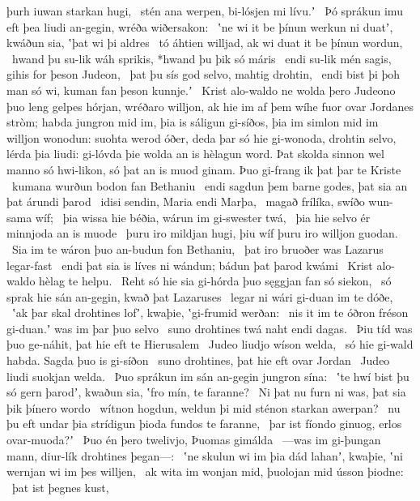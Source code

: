 þurh iuwan starkan hugi, \hld\ stén ana werpen,
bi-lósjen mi lívu.ʼ \hld\ Þó sprákun imu eft þea liudi an-gegin,
wréða wiðersakon: \hld\ ʽne wi it be þínun werkun ni duatʼ, kwáðun sia,
ʽþat wi þi aldres \hld\ tó áhtien willjad,
ak wi duat it be þínun wordun, \hld\ hwand þu su-lik wáh sprikis,
*hwand þu þik só máris \hld\ endi su-lik mén sagis,
gihis for þeson Judeon, \hld\ þat þu sís god selvo,
mahtig drohtin, \hld\ endi bist þi þoh man só wi,
kuman fan þeson kunnje.ʼ \hld\ Krist alo-waldo
ne wolda þero Judeono þuo leng gelpes hórjan,
wréðaro willjon, ak hie im af þem wíhe fuor
ovar Jordanes stròm; habda jungron mid im,
þia is sáligun gi-síðos, þia im simlon mid im
willjon wonodun: suohta werod óðer,
deda þar só hie gi-wonoda, drohtin selvo,
lérda þia liudi: gi-lóvda þie wolda
an is hèlagun word. Þat skolda sinnon wel
manno só hwi-likon, só þat an is muod ginam.
Þuo gi-frang ik þat þar te Kriste \hld\ kumana wurðun %
bodon fan Bethaniu \hld\ endi sagdun þem barne godes,
þat sia an þat árundi þarod \hld\ idisi sendin,
Maria endi Marþa, \hld\ magað frílíka,
swíðo wun-sama wíf; \hld\ þia wissa hie béðia,
wárun im gi-swester twá, \hld\ þia hie selvo ér
minnjoda an is muode \hld\ þuru iro mildjan hugi,
þiu wíf þuru iro willjon guodan. \hld\ Sia im te wáron þuo
an-budun fon Bethaniu, \hld\ þat iro bruoðer was
Lazarus legar-fast \hld\ endi þat sia is líves ni wándun;
bádun þat þarod kwámi \hld\ Krist alo-waldo
hèlag te helpu. \hld\ Reht só hie sia gi-hórda þuo
sęggjan fan só siekon, \hld\ só sprak hie sán an-gegin,
kwað þat Lazaruses \hld\ legar ni wári
gi-duan im te dóðe, \hld\ ʽak þar skal drohtines lofʼ, kwaþie,
ʽgi-frumid werðan: \hld\ nis it im te óðron fréson gi-duan.ʼ
was im þar þuo selvo \hld\ suno drohtines
twá naht endi dagas. \hld\ Þiu tíd was þuo ge-náhit,
þat hie eft te Hierusalem \hld\ Judeo liudjo
wíson welda, \hld\ só hie gi-wald habda.
Sagda þuo is gi-síðon \hld\ suno drohtines,
þat hie eft ovar Jordan \hld\ Judeo liudi
suokjan welda. \hld\ Þuo sprákun im sán an-gegin
jungron sína: \hld\ ʽte hwí bist þu só gern þarodʼ, kwaðun sia,
ʽfro mín, te faranne? \hld\ Ni þat nu furn ni was,
þat sia þik þínero wordo \hld\ wítnon hogdun,
weldun þi mid sténon starkan awerpan? \hld\ nu þu eft undar þia strídigun þioda
fundos te faranne, \hld\ þar ist fíondo ginuog,
erlos ovar-muoda?ʼ \hld\ Þuo én þero twelivjo,
Þuomas gimálda \hld\ —was im gi-þungan mann,
diur-lík drohtines þegan—: \hld\ ʽne skulun wi im þia dád lahanʼ, kwaþie,
ʽni wernjan wi im þes willjen, \hld\ ak wita im wonjan mid,
þuolojan mid ússon þiodne: \hld\ þat ist þegnes kust,

